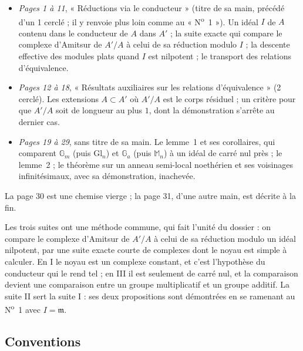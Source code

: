 \documentclass[11pt,a4paper]{article}
\begin{document}
\begin{itemize}
  \item[I.] \emph{Pages 1 à 11}, « Réductions via le conducteur » (titre de
  sa main, précédé d'un 1 cerclé ; il y renvoie plus loin comme au
  « N\textsuperscript{o}~1 »). Un idéal $I$ de $A$ contenu dans le
  conducteur de $A$ dans $A'$ ; la suite exacte qui compare le complexe
  d'Amitsur de $A'/A$ à celui de sa réduction modulo $I$ ; la descente
  effective des modules plats quand $I$ est nilpotent ; le transport des
  relations d'équivalence.
  \item[II.] \emph{Pages 12 à 18}, « Résultats auxiliaires sur les relations
  d'équivalence » (2 cerclé). Les extensions $A \subset A'$ où $A'/A$ est le
  corps résiduel ; un critère pour que $A'/A$ soit de longueur au plus $1$,
  dont la démonstration s'arrête au dernier cas.
  \item[III.] \emph{Pages 19 à 29}, sans titre de sa main. Le lemme~1 et ses
  corollaires, qui comparent $\mathbb{G}_m$ (puis $\mathrm{Gl}_n$) et
  $\mathbb{G}_a$ (puis $\mathbb{M}_n$) à un idéal de carré nul près ; le
  lemme~2 ; le théorème sur un anneau semi-local noethérien et ses
  voisinages infinitésimaux, avec sa démonstration, inachevée.
\end{itemize}
La page 30 est une chemise vierge ; la page 31, d'une autre main, est décrite
à la fin.

Les trois suites ont une méthode commune, qui fait l'unité du dossier : on
compare le complexe d'Amitsur de $A'/A$ à celui de sa réduction modulo un
idéal nilpotent, par une suite exacte courte de complexes dont le noyau est
simple à calculer. En I le noyau est un complexe constant, et c'est l'hypothèse
du conducteur qui le rend tel ; en III il est seulement de carré nul, et la
comparaison devient une comparaison entre un groupe multiplicatif et un groupe
additif. La suite II sert la suite I : ses deux propositions sont démontrées
en se ramenant au N\textsuperscript{o}~1 avec $I = \mathfrak{m}$.

\subsection*{Conventions}
\end{document}
